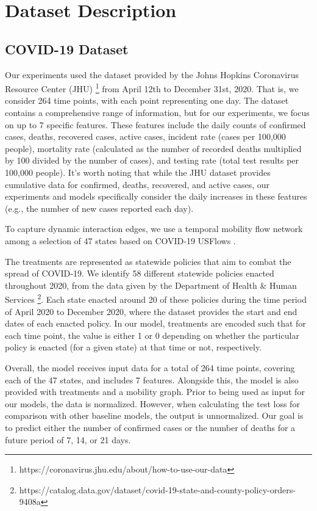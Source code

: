 \appendix
\section{Dataset Description} \label{sec:dataset_descriptions}
\subsection{COVID-19 Dataset}\label{sec:covid19_dataset}

 Our experiments used the dataset provided by the Johns Hopkins Coronavirus Resource Center (JHU) \footnote{https://coronavirus.jhu.edu/about/how-to-use-our-data} from April 12th to December 31st, 2020. That is, we consider 264 time points, with each point representing one day. 
 The dataset contains a comprehensive range of information, but for our experiments, we focus on up to 7 specific features. These features include the daily counts of confirmed cases, deaths, recovered cases, active cases, incident rate (cases per 100,000 people), mortality rate (calculated as the number of recorded deaths multiplied by 100 divided by the number of cases), and testing rate (total test results per 100,000 people). It's worth noting that while the JHU dataset provides cumulative data for confirmed, deaths, recovered, and active cases, our experiments and models specifically consider the daily increases in these features (e.g., the number of new cases reported each day).


To capture dynamic interaction edges, we use a temporal mobility flow network among a selection of 47 states based on COVID-19 USFlows \cite{mobility}.

The treatments are represented as statewide policies that aim to combat the spread of COVID-19. We identify 58 different statewide policies enacted throughout 2020, from the data given by the Department of Health \& Human Services \footnote{https://catalog.data.gov/dataset/covid-19-state-and-county-policy-orders-9408a}. Each state enacted around 20 of these policies during the time period of April 2020 to December 2020, where the dataset provides the start and end dates of each enacted policy. In our model, treatments are encoded such that for each time point, the value is either 1 or 0 depending on whether the particular policy is enacted (for a given state) at that time or not, respectively. 

Overall, the model receives input data for a total of 264 time points, covering each of the 47 states, and includes 7 features. Alongside this, the model is also provided with treatments and a mobility graph. Prior to being used as input for our models, the data is normalized. However, when calculating the test loss for comparison with other baseline models, the output is unnormalized. Our goal is to predict either the number of confirmed cases or the number of deaths for a future period of 7, 14, or 21 days.
 
